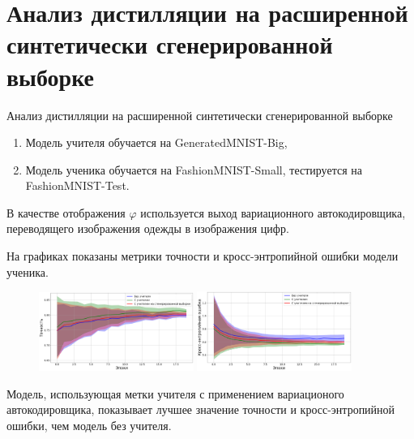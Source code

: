 \documentclass[10pt,pdf,hyperref={unicode}]{beamer}
\begin{document}
\section{Анализ дистилляции на расширенной синтетически сгенерированной выборке}
\begin{frame}{Анализ дистилляции на расширенной синтетически сгенерированной выборке}
\justifying
\begin{enumerate}[1)]
    \item Модель учителя обучается на GeneratedMNIST-Big,
    \item Модель ученика обучается на FashionMNIST-Small, тестируется на FashionMNIST-Test.
\end{enumerate}

\par
В качестве отображения $\varphi$ используется выход вариационного автокодировщика, переводящего изображения одежды в изображения цифр.

На графиках показаны метрики точности и кросс-энтропийной ошибки модели ученика.

\begin{figure}[h!]
\includegraphics[width=0.45\textwidth]{results/ext_mnist_acc.png}
\includegraphics[width=0.45\textwidth]{results/ext_mnist_loss.png}
\end{figure}

Модель, использующая метки учителя с применением вариационого автокодировщика, показывает лучшее значение точности и кросс-энтропийной ошибки, чем модель без учителя.

\end{frame}

\end{document}
